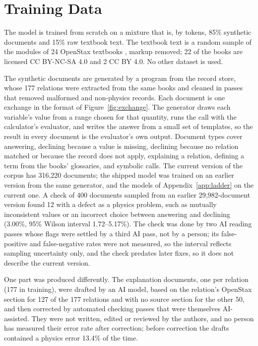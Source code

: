 \documentclass[10pt]{article}
\newif\ifdeanonymized
\newcommand{\theauthor}{\ifdeanonymized the author\else the authors\fi}
\begin{document}
\section{Training Data}
\label{sec:data}

The model is trained from scratch on a mixture that is, by tokens, 85\% synthetic
documents and 15\% raw textbook text. The textbook text is a random sample of the modules of 24 OpenStax
textbooks \citep{openstax}, markup removed; 22 of the books are licensed CC BY-NC-SA 4.0 and 2 CC BY 4.0. No
other dataset is used.

The synthetic documents are generated by a program from the record store, whose 177 relations were
extracted from the same books and cleaned in passes that removed malformed and non-physics records.
Each document is one exchange in the format of Figure~\ref{fig:exchange}. The generator draws each
variable's value from a range chosen for that quantity, runs the call with the calculator's evaluator,
and writes the answer from a small set of templates, so the result in every document is the
evaluator's own output. Document types cover answering, declining because a value is missing,
declining because no relation matched or because the record does not apply, explaining a relation,
defining a term from the books' glossaries, and symbolic calls. The current version of the corpus
has 316,220 documents; the shipped model was trained on an earlier version from the same generator,
and the models of Appendix~\ref{app:ladder} on the current one. A check of 400 documents sampled from
an earlier 29,982-document version found 12 with a defect as a physics problem, such as mutually
inconsistent values or an incorrect choice between answering and declining
(3.00\%, 95\% Wilson interval 1.72--5.17\%). The check was done by two AI reading passes whose flags
were settled by a third AI pass, not by a person; its false-positive and false-negative rates were not measured, so
the interval reflects sampling uncertainty only, and the check predates later fixes, so it does not
describe the current version.

One part was produced differently. The explanation documents, one per relation (177 in training),
were drafted by an AI model, based on the relation's OpenStax section for 127 of the 177 relations
and with no source section for the other 50, and then corrected by automated checking passes that
were themselves AI-assisted. They were not written, edited or reviewed by \theauthor, and no person
has measured their error rate after correction; before correction the drafts contained a physics
error 13.4\% of the time.
\end{document}
